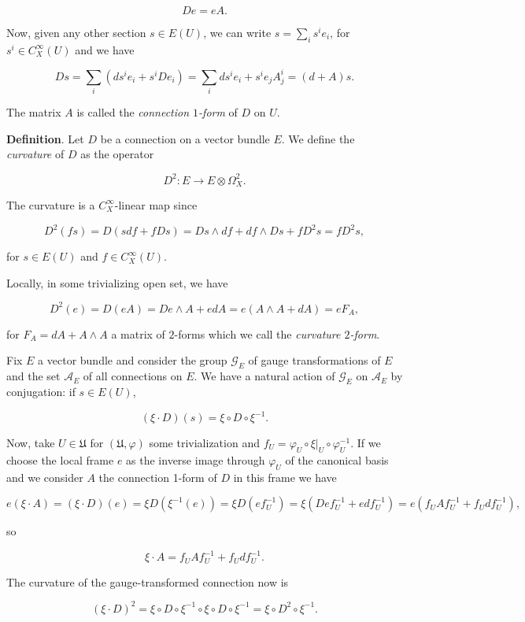 \documentclass[]{article}
\begin{document}
\[
De= eA.
\]

Now, given any other section \(s\in E(U)\), we can write
\(s=\sum_i s^i e_i\), for \(s^i \in C^\infty_X(U)\) and we have

\[
D s = \sum_i (d s^i e_i + s^i D e_i) = \sum_i ds^i e_i + s^i e_j A^i_j  = (d+A) s.
\]

The matrix \(A\) is called the \emph{connection \(1\)-form} of \(D\) on
\(U\).

\textbf{Definition}. Let \(D\) be a connection on a vector bundle \(E\).
We define the \emph{curvature} of \(D\) as the operator

\[
D^2: E \rightarrow E \otimes \Omega^2_X.
\]

The curvature is a \(C^\infty_X\)-linear map since

\[
D^2(fs)=D(sdf + fDs)=Ds \wedge df + df \wedge Ds + f D^2 s= fD^2 s,
\]

for \(s\in E(U)\) and \(f \in C^\infty_X(U)\).

Locally, in some trivializing open set, we have

\[
D^2(e)=D(eA) = De \wedge A + edA = e(A\wedge A + dA)=e F_A,
\]

for \(F_A= dA + A\wedge A\) a matrix of \(2\)-forms which we call the
\emph{curvature \(2\)-form}.

Fix \(E\) a vector bundle and consider the group \(\mathcal{G}_E\) of
gauge transformations of \(E\) and the set \(\mathcal{A}_E\) of all
connections on \(E\). We have a natural action of \(\mathcal{G}_E\) on
\(\mathcal{A}_E\) by conjugation: if \(s\in E(U)\),

\[
(\xi \cdot D) (s) = \xi \circ D \circ \xi^{-1}.
\]

Now, take \(U\in \mathfrak{U}\) for \((\mathfrak{U},\varphi)\) some
trivialization and \(f_U= \varphi_U \circ \xi|_U \circ \varphi_U^{-1}\).
If we choose the local frame \(e\) as the inverse image through
\(\varphi_U\) of the canonical basis and we consider \(A\) the
connection 1-form of \(D\) in this frame we have

\[
e (\xi \cdot A) = (\xi \cdot D) (e) = \xi D(\xi^{-1}(e)) = \xi D(ef_U^{-1}) = \xi (De f_U^{-1} + e df_U^{-1}) = e(f_U A f_U^{-1}  + f_U df_U^{-1}),
\]

so

\[
\xi \cdot A =f_U A f_U^{-1}  + f_U df_U^{-1}.
\]

The curvature of the gauge-transformed connection now is

\[
(\xi \cdot D)^2= \xi \circ D \circ \xi^{-1} \circ \xi \circ D \circ \xi^{-1} = \xi \circ D^2 \circ \xi^{-1}.
\]
\end{document}
